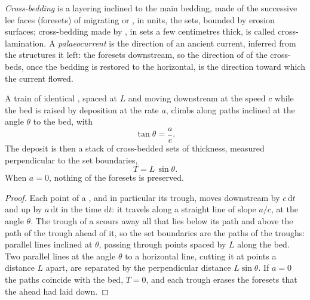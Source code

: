 \begin{definition}\label{def:b1:clastic-sediments:cross-bedding}
\emph{Cross-bedding} is a layering inclined to the main
bedding, made of the successive lee faces (foresets) of migrating  or
, in units, the sets, bounded by erosion surfaces; cross-bedding made by
, in sets a few centimetres thick, is called cross-lamination. A
\emph{palaeocurrent} is the direction of an ancient
current, inferred from the structures it left: the foresets  downstream, so
the direction of  of the cross-beds, once the bedding is restored to the
horizontal, is the direction toward which the current flowed.
\end{definition}

\begin{proposition}\label{prop:b1:clastic-sediments:climb}
A train of identical , spaced at $L$ and moving downstream at the speed
$c$ while the bed is raised by deposition at the rate $a$, climbs along paths
inclined at the angle $\theta$ to the bed, with
\[
  \tan\theta = \frac{a}{c}.
\]
The deposit is then a stack of cross-bedded sets of thickness, measured
perpendicular to the set boundaries,
\[
  T = L\,\sin\theta .
\]
When $a = 0$, nothing of the foresets is preserved.
\end{proposition}

\begin{proof}
Each point of a , and in particular its trough, moves downstream by
$c\,\mathrm dt$ and up by $a\,\mathrm dt$ in the time $\mathrm dt$: it travels
along a straight line of slope $a/c$, at the angle $\theta$. The trough of a
 scours away all that lies below its path and above the path of the
trough ahead of it, so the set boundaries are the paths of the troughs: parallel
lines inclined at $\theta$, passing through points spaced by $L$ along the bed.
Two parallel lines at the angle $\theta$ to a horizontal line, cutting it at
points a distance $L$ apart, are separated by the perpendicular distance
$L\sin\theta$. If $a = 0$ the paths coincide with the bed, $T = 0$, and each
trough erases the foresets that the  ahead had laid down.
\end{proof}

